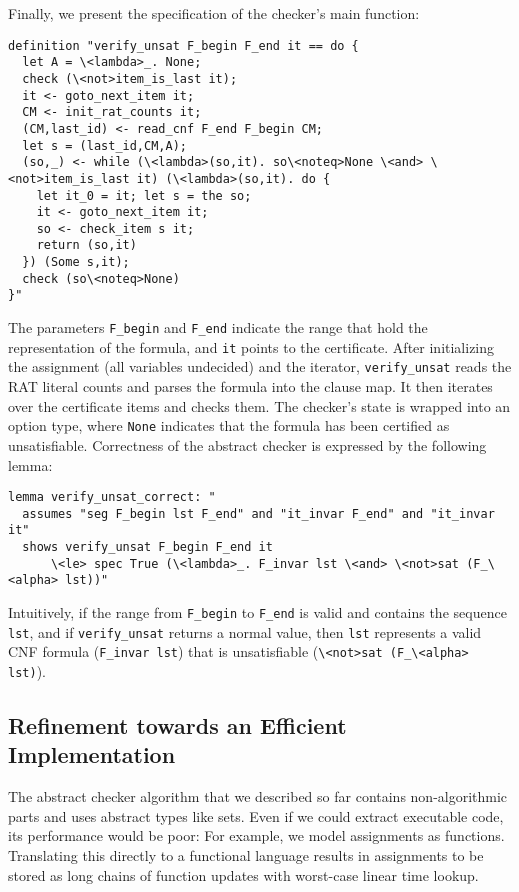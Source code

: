 \documentclass{llncs}
\newcommand{\isai}{\lstinline[language=isabelle,basicstyle=\normalsize\ttfamily\slshape]}
\begin{document}
Finally, we present the specification of the checker's main function:
\begin{lstlisting}
definition "verify_unsat F_begin F_end it == do {
  let A = \<lambda>_. None;
  check (\<not>item_is_last it);
  it <- goto_next_item it;
  CM <- init_rat_counts it;
  (CM,last_id) <- read_cnf F_end F_begin CM;
  let s = (last_id,CM,A);
  (so,_) <- while (\<lambda>(so,it). so\<noteq>None \<and> \<not>item_is_last it) (\<lambda>(so,it). do {
    let it_0 = it; let s = the so;
    it <- goto_next_item it;
    so <- check_item s it;
    return (so,it)
  }) (Some s,it);
  check (so\<noteq>None)
}"
\end{lstlisting}
The parameters \isai{F_begin} and \isai{F_end} indicate the range that hold the representation of the formula, and \isai{it} points to the 
certificate. %
After initializing the assignment (all variables undecided) and the iterator, \isai{verify_unsat} reads the RAT literal counts
and parses the formula into the clause map. It then iterates over the certificate items and checks them. 
The checker's state is wrapped into an option type, where \isai{None} indicates that the formula has been certified as unsatisfiable.
%
Correctness of the abstract checker is expressed by the following lemma:
\begin{lstlisting}
lemma verify_unsat_correct: "
  assumes "seg F_begin lst F_end" and "it_invar F_end" and "it_invar it" 
  shows verify_unsat F_begin F_end it 
      \<le> spec True (\<lambda>_. F_invar lst \<and> \<not>sat (F_\<alpha> lst))"
\end{lstlisting}
Intuitively, if the range from \isai{F_begin} to \isai{F_end} is valid and contains the sequence \isai{lst},
and if \isai{verify_unsat} returns a normal value, then \isai{lst} represents a valid CNF formula (\isai{F_invar lst}) 
that is unsatisfiable (\isai{\<not>sat (F_\<alpha> lst)}).

\subsection{Refinement towards an Efficient Implementation}    
The abstract checker algorithm that we described so far contains non-algorithmic parts and uses abstract types like sets.
Even if we could extract executable code, its performance would be poor: For example, we model assignments as functions. Translating 
this directly to a functional language results in assignments to be stored as long chains of function updates with worst-case linear time lookup.
\end{document}
